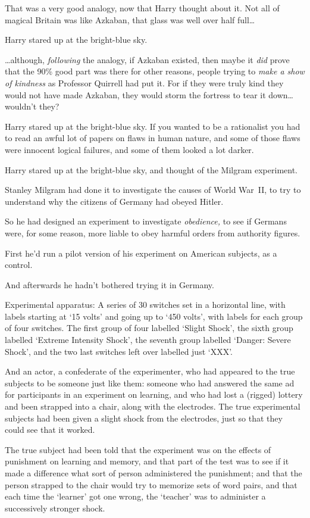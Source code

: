 That was a very good analogy, now that Harry thought about it. Not all of magical Britain was like Azkaban, that glass was well over half full…

Harry stared up at the bright-blue sky.

…although, \emph{following} the analogy, if Azkaban existed, then maybe it \emph{did} prove that the 90\% good part was there for other reasons, people trying to \emph{make a show of kindness} as Professor Quirrell had put it. For if they were truly kind they would not have made Azkaban, they would storm the fortress to tear it down…wouldn’t they?

Harry stared up at the bright-blue sky. If you wanted to be a rationalist you had to read an awful lot of papers on flaws in human nature, and some of those flaws were innocent logical failures, and some of them looked a lot darker.

Harry stared up at the bright-blue sky, and thought of the Milgram experiment.

Stanley Milgram had done it to investigate the causes of World War~II, to try to understand why the citizens of Germany had obeyed Hitler.

So he had designed an experiment to investigate \emph{obedience,} to see if Germans were, for some reason, more liable to obey harmful orders from authority figures.

First he’d run a pilot version of his experiment on American subjects, as a control.

And afterwards he hadn’t bothered trying it in Germany.

Experimental apparatus: A series of 30 switches set in a horizontal line, with labels starting at ‘15 volts’ and going up to ‘450 volts’, with labels for each group of four switches. The first group of four labelled ‘Slight Shock’, the sixth group labelled ‘Extreme Intensity Shock’, the seventh group labelled ‘Danger: Severe Shock’, and the two last switches left over labelled just ‘XXX’.

And an actor, a confederate of the experimenter, who had appeared to the true subjects to be someone just like them: someone who had answered the same ad for participants in an experiment on learning, and who had lost a (rigged) lottery and been strapped into a chair, along with the electrodes. The true experimental subjects had been given a slight shock from the electrodes, just so that they could see that it worked.

The true subject had been told that the experiment was on the effects of punishment on learning and memory, and that part of the test was to see if it made a difference what sort of person administered the punishment; and that the person strapped to the chair would try to memorize sets of word pairs, and that each time the ‘learner’ got one wrong, the ‘teacher’ was to administer a successively stronger shock.

